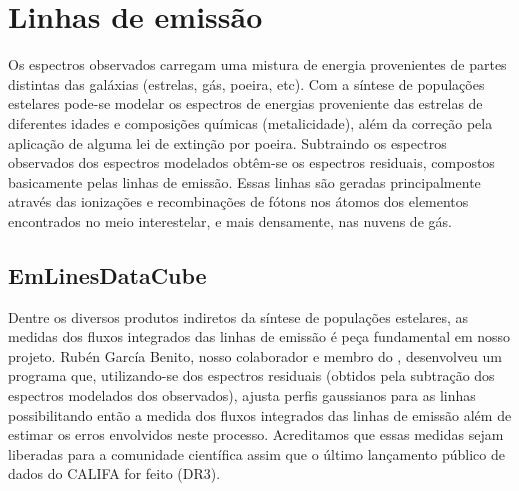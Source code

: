 


\chapter{Linhas de emissão}
\label{sec:emlines}

Os espectros observados carregam uma mistura de energia provenientes de partes distintas das
galáxias (estrelas, gás, poeira, etc). Com a síntese de populações estelares pode-se modelar os
espectros de energias proveniente das estrelas de diferentes idades e composições químicas
(metalicidade), além da correção pela aplicação de alguma lei de extinção por poeira. Subtraindo os
espectros observados dos espectros modelados obtêm-se os espectros residuais, compostos basicamente
pelas linhas de emissão. Essas linhas são geradas principalmente através das ionizações e
recombinações de fótons nos átomos dos elementos encontrados no meio interestelar, e mais
densamente, nas nuvens de gás.

\section{EmLinesDataCube}
\label{sec:emline:datacube}

Dentre os diversos produtos indiretos da síntese de populações estelares, as medidas dos fluxos
integrados das linhas de emissão é peça fundamental em nosso projeto. Rubén García Benito, nosso
colaborador e membro do \PCAL, desenvolveu um programa que, utilizando-se dos espectros residuais
(obtidos pela subtração dos espectros modelados dos observados), ajusta perfis gaussianos para as
linhas possibilitando então a medida dos fluxos integrados das linhas de emissão além de estimar os
erros envolvidos neste processo. Acreditamos que essas medidas sejam liberadas para a comunidade
científica assim que o último lançamento público de dados do CALIFA for feito (DR3).

